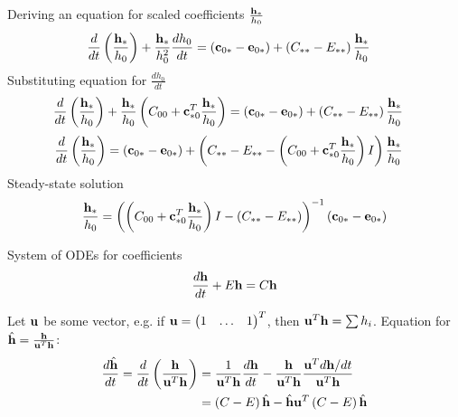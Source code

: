 \documentclass{article}[draft]
\begin{document}
Deriving an equation for scaled coefficients $\frac{\mathbf{h}_\ast}{h_0}$
\begin{align*}
\frac{d}{dt} \left( \frac{\mathbf{h}_\ast}{h_0} \right) + \frac{\mathbf{h}_\ast}{h_0^2} \frac{dh_0}{dt} &= 
\left( \mathbf{c}_{0\ast} - \mathbf{e}_{0\ast} \right)
+ \left( C_{\ast\ast} - E_{\ast\ast} \right) \frac{\mathbf{h}_\ast}{h_0}
\end{align*}
Substituting equation for $\frac{dh_0}{dt}$
\begin{align*}
\frac{d}{dt} \left( \frac{\mathbf{h}_\ast}{h_0} \right) 
+ \frac{\mathbf{h}_\ast}{h_0} \left(C_{00} + \mathbf{c}_{\ast 0}^T \frac{\mathbf{h}_\ast}{h_0} \right) &= 
\left( \mathbf{c}_{0\ast} - \mathbf{e}_{0\ast} \right)
+ \left( C_{\ast\ast} - E_{\ast\ast} \right) \frac{\mathbf{h}_\ast}{h_0}
\end{align*}
\begin{align*}
\frac{d}{dt} \left( \frac{\mathbf{h}_\ast}{h_0} \right) 
&= 
\left( \mathbf{c}_{0\ast} - \mathbf{e}_{0\ast} \right)
+ \left( C_{\ast\ast} - E_{\ast\ast} - \left(C_{00} + \mathbf{c}_{\ast 0}^T \frac{\mathbf{h}_\ast}{h_0} \right) I \right) \frac{\mathbf{h}_\ast}{h_0}
\end{align*}
Steady-state solution
\begin{align*}
\frac{\mathbf{h}_\ast}{h_0} = 
\left( \left(C_{00} + \mathbf{c}_{\ast 0}^T \frac{\mathbf{h}_\ast}{h_0} \right) I
- \left( C_{\ast\ast} - E_{\ast\ast} \right) \right)^{-1}
\left( \mathbf{c}_{0\ast} - \mathbf{e}_{0\ast} \right)
\end{align*}


\newpage


System of ODEs for coefficients
\begin{align*}
\frac{d \mathbf{h}}{dt} + E \mathbf{h} = C \mathbf{h}
\end{align*}

Let $\mathbf{u}$ be some vector, e.g. if $\mathbf{u} = \begin{pmatrix}
1 & \ldots & 1 
\end{pmatrix}^T$, then $\mathbf{u}^T \mathbf{h} = \sum h_i$.
Equation for $\hat{\mathbf{h}} = \frac{\mathbf{h}}{\mathbf{u}^T \mathbf{h}}$:
\begin{align*}
\frac{d \hat{\mathbf{h}}}{dt} 
=
\frac{d}{dt} \left( \frac{\mathbf{h}}{\mathbf{u}^T \mathbf{h}} \right) 
&= 
\frac{1}{\mathbf{u}^T \mathbf{h}} \frac{d\mathbf{h}}{dt}
- \frac{\mathbf{h}}{\mathbf{u}^T \mathbf{h}} \frac{\mathbf{u}^T d\mathbf{h}/dt}{\mathbf{u}^T \mathbf{h}}
\\
&= \left( C - E \right) \hat{\mathbf{h}} - \hat{\mathbf{h}} \mathbf{u}^T \left( C - E \right) \hat{\mathbf{h}}
\end{align*}
\end{document}
